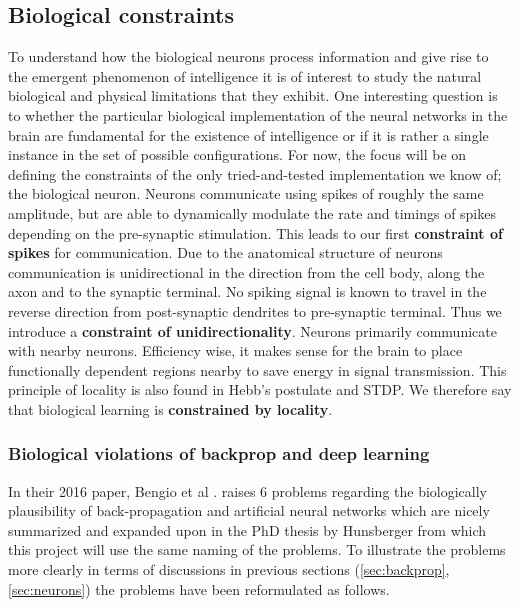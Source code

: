 \documentclass[a4paper,11pt]{article} %
\begin{document}
\subsection{Biological constraints} \label{sec:biological-constraints}
To understand how the biological neurons process information and give rise to the emergent phenomenon of intelligence it is of interest to study the natural biological and physical limitations that they exhibit. One interesting question is to whether the particular biological implementation of the neural networks in the brain are fundamental for the existence of intelligence or if it is rather a single instance in the set of possible configurations. For now, the focus will be on defining the constraints of the only tried-and-tested implementation we know of; the biological neuron. Neurons communicate using spikes of roughly the same amplitude, but are able to dynamically modulate the rate and timings of spikes depending on the pre-synaptic stimulation. This leads to our first \textbf{constraint of spikes} for communication. Due to the anatomical structure of neurons communication is unidirectional in the direction from the cell body, along the axon and to the synaptic terminal. No spiking signal is known to travel in the reverse direction from post-synaptic dendrites to pre-synaptic terminal. Thus we introduce a \textbf{constraint of unidirectionality}. Neurons primarily communicate with nearby neurons. Efficiency wise, it makes sense for the brain to place functionally dependent regions nearby to save energy in signal transmission. This principle of locality is also found in Hebb's postulate and STDP. We therefore say that biological learning is \textbf{constrained by locality}.

\subsubsection{Biological violations of backprop and deep learning}
In their 2016 paper, Bengio et al \cite{BengioLBL15}. raises 6 problems regarding the biologically plausibility of back-propagation and artificial neural networks which are nicely summarized and expanded upon in the PhD thesis by Hunsberger \cite{Eric2018} from which this project will use the same naming of the problems. To illustrate the problems more clearly in terms of discussions in previous sections (\ref{sec:backprop}, \ref{sec:neurons}) the problems have been reformulated as follows.
\end{document}
